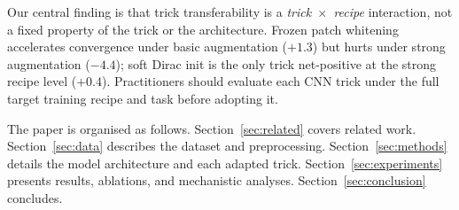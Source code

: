 Our central finding is that trick transferability is a \emph{trick~$\times$~recipe} interaction, not a fixed property of the trick or the architecture.
Frozen patch whitening accelerates convergence under basic augmentation ($+1.3$\pp{}) but hurts under strong augmentation ($-4.4$\pp{}); soft Dirac init is the only trick net-positive at the strong recipe level ($+0.4$\pp{}).
Practitioners should evaluate each CNN trick under the full target training recipe and task before adopting it.

The paper is organised as follows. Section~\ref{sec:related} covers related work. Section~\ref{sec:data} describes the dataset and preprocessing. Section~\ref{sec:methods} details the model architecture and each adapted trick. Section~\ref{sec:experiments} presents results, ablations, and mechanistic analyses. Section~\ref{sec:conclusion} concludes.


